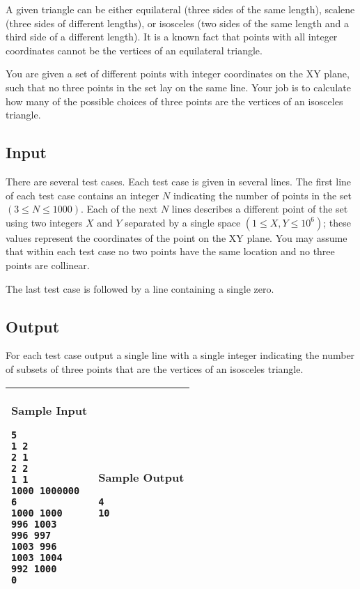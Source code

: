 A given triangle can be either equilateral (three sides of the same length),
scalene (three sides of different lengths), or isosceles (two sides of the same
length and a third side of a different length). It is a known fact that
points with all integer coordinates cannot be the vertices of an equilateral
triangle.

You are given a set of different points with integer coordinates on the XY
plane, such that no three points in the set lay on the same line. Your job is
to calculate how many of the possible choices of three points are the vertices
of an isosceles triangle.

\subsection*{Input}

There are several test cases. Each test case is given in several lines. The
first line of each test case contains an integer $N$ indicating the number of
points in the set $(3 \leq N  \leq 1000)$. Each of the next $N$ lines describes a
different point of the set using two integers $X$ and $Y$ separated by a single
space $(1 \leq X, Y \leq 10^6)$; these values represent the coordinates of the
point on the XY plane. You may assume that within each test case no two points
have the same location and no three points are collinear.

The last test case is followed by a line containing a single zero.

\subsection*{Output}

For each test case output a single line with a single integer indicating the
number of subsets of three points that are the vertices of an isosceles
triangle.

\begin{table}[!h]
\centering
\begin{tabular}{|l|l|}
\hline
\begin{minipage}[t]{3in}
\textbf{Sample Input}
\begin{verbatim}
5
1 2
2 1
2 2
1 1
1000 1000000
6
1000 1000
996 1003
996 997
1003 996
1003 1004
992 1000
0
\end{verbatim}
\vspace{1mm}
\end{minipage}
&

\begin{minipage}[t]{3in}
\textbf{Sample Output}
\begin{verbatim}
4
10
\end{verbatim}
\vspace{1mm}
\end{minipage} \\
\hline
\end{tabular}
\end{table}

\newpage
